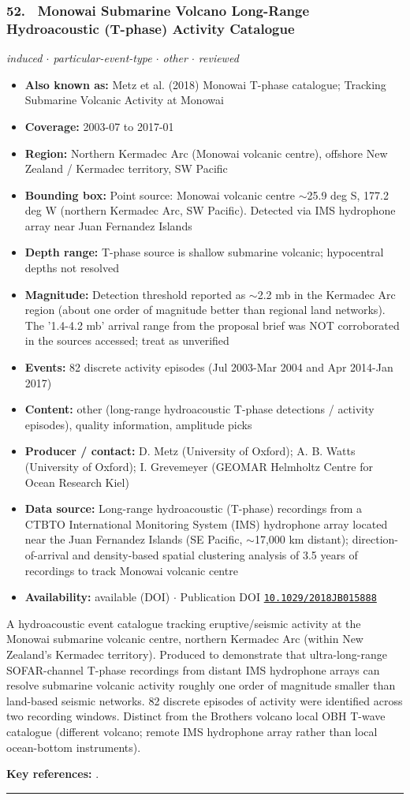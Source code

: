 \documentclass[10pt,a4paper]{article}
\newcommand{\catentryrule}{\par\vspace{3pt}\noindent\textcolor{rulegrey}{\rule{\linewidth}{0.3pt}}\par\vspace{5pt}}
\newcommand{\kv}[2]{\item \textbf{#1:} #2}
\begin{document}
\subsubsection*{\hypertarget{c:52}{52.}~ Monowai Submarine Volcano Long-Range Hydroacoustic (T-phase) Activity Catalogue}
{\small\itshape induced $\cdot$ particular-event-type $\cdot$ other $\cdot$ reviewed}\par\vspace{2pt}
\begin{itemize}[leftmargin=1.3em,itemsep=0.6pt,topsep=1pt,parsep=0pt]
\kv{Also known as}{Metz et al. (2018) Monowai T-phase catalogue; Tracking Submarine Volcanic Activity at Monowai}
\kv{Coverage}{2003-07 to 2017-01}
\kv{Region}{Northern Kermadec Arc (Monowai volcanic centre), offshore New Zealand / Kermadec territory, SW Pacific}
\kv{Bounding box}{Point source: Monowai volcanic centre $\sim$25.9 deg S, 177.2 deg W (northern Kermadec Arc, SW Pacific). Detected via IMS hydrophone array near Juan Fernandez Islands}
\kv{Depth range}{T-phase source is shallow submarine volcanic; hypocentral depths not resolved}
\kv{Magnitude}{Detection threshold reported as $\sim$2.2 mb in the Kermadec Arc region (about one order of magnitude better than regional land networks). The '1.4-4.2 mb' arrival range from the proposal brief was NOT corroborated in the sources accessed; treat as unverified}
\kv{Events}{82 discrete activity episodes (Jul 2003-Mar 2004 and Apr 2014-Jan 2017)}
\kv{Content}{other (long-range hydroacoustic T-phase detections / activity episodes), quality information, amplitude picks}
\kv{Producer / contact}{D. Metz (University of Oxford); A. B. Watts (University of Oxford); I. Grevemeyer (GEOMAR Helmholtz Centre for Ocean Research Kiel)}
\kv{Data source}{Long-range hydroacoustic (T-phase) recordings from a CTBTO International Monitoring System (IMS) hydrophone array located near the Juan Fernandez Islands (SE Pacific, $\sim$17,000 km distant); direction-of-arrival and density-based spatial clustering analysis of 3.5 years of recordings to track Monowai volcanic centre}
\kv{Availability}{available (DOI) $\cdot$ Publication DOI \href{https://doi.org/10.1029/2018JB015888}{\nolinkurl{10.1029/2018JB015888}}}
\end{itemize}
\par\vspace{2pt}A hydroacoustic event catalogue tracking eruptive/seismic activity at the Monowai submarine volcanic centre, northern Kermadec Arc (within New Zealand's Kermadec territory). Produced to demonstrate that ultra-long-range SOFAR-channel T-phase recordings from distant IMS hydrophone arrays can resolve submarine volcanic activity roughly one order of magnitude smaller than land-based seismic networks. 82 discrete episodes of activity were identified across two recording windows. Distinct from the Brothers volcano local OBH T-wave catalogue (different volcano; remote IMS hydrophone array rather than local ocean-bottom instruments).
\par\vspace{2pt}\textbf{Key references:} \cite{Metz2018,Metz2016}.
\catentryrule
\end{document}
